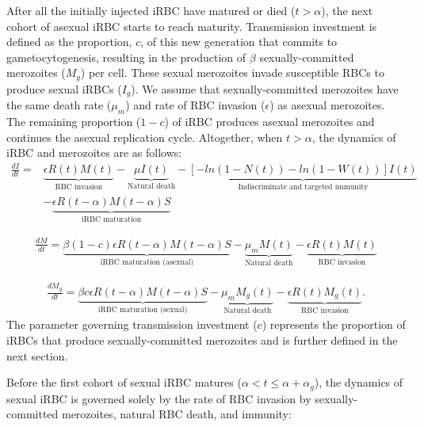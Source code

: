 \documentclass[10pt,letterpaper]{article}
\begin{document}
After all the initially injected iRBC have matured or died ($t>\alpha$), the next cohort of asexual iRBC starts to reach maturity. Transmission investment is defined as the proportion,  $c$, of this new generation that commits to gametocytogenesis, resulting in the production of $\beta$ sexually-committed merozoites ($M_{g}$) per cell. These sexual merozoites invade susceptible RBCs to produce sexual iRBCs ($I_{g}$). We assume that sexually-committed merozoites have the same death rate ($\mu_{m}$) and rate of RBC invasion ($\epsilon$) as asexual merozoites. The remaining proportion ($1-c$) of iRBC produces asexual merozoites and continues the asexual replication cycle. Altogether, when $t>\alpha$, the dynamics of iRBC and merozoites are as follows:
\begin{equation}
\label{eq:scheme4}
\begin{split}
\frac{dI}{dt}=& \underbrace{\epsilon R(t)M(t)}_{\text{RBC invasion}}-\underbrace{\mu I(t)}_{\text{Natural death}}-\underbrace{[-ln(1-N(t))-ln(1-W(t))]I(t)}_{\text{Indiscriminate and targeted immunity}}\\ 
& -\underbrace{\epsilon R(t-\alpha)M(t-\alpha)S}_{\text{iRBC maturation}}
\end{split}
\end{equation}

\begin{eqnarray}
\label{eq:scheme5}
    \frac{dM}{dt}=\underbrace{\beta (1-c)\epsilon R(t-\alpha)M(t-\alpha)S}_{\text{iRBC maturation (asexual)}}-\underbrace{\mu_{m}M(t)}_{\text{Natural death}}-\underbrace{\epsilon R(t)M(t)}_{\text{RBC invasion}}
\end{eqnarray}

\begin{eqnarray}
\label{eq:scheme6}
    \frac{dM_{g}}{dt}=\underbrace{\beta c\epsilon R(t-\alpha)M(t-\alpha)S}_{\text{iRBC maturation (sexual)}}-\underbrace{\mu_{m}M_{g}(t)}_{\text{Natural death}}-\underbrace{\epsilon R(t)M_{g}(t)}_{\text{RBC invasion}}.
\end{eqnarray} 
The parameter governing transmission investment ($c$) represents the proportion of iRBCs that produce sexually-committed merozoites and is further defined in the next section. \newline

Before the first cohort of sexual iRBC matures (\(\alpha < t \leq \alpha +\alpha_{g}\)), the dynamics of sexual iRBC is governed solely by the rate of RBC invasion by sexually-committed merozoites, natural RBC death, and immunity:
\end{document}
